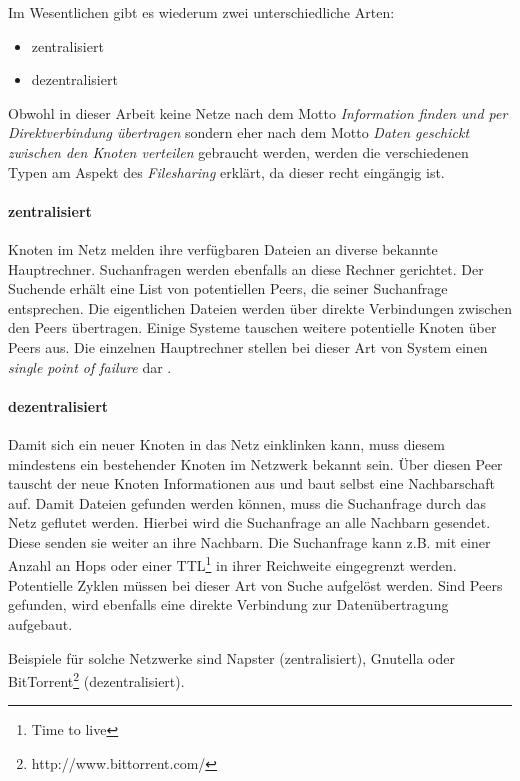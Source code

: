 Im Wesentlichen gibt es wiederum zwei unterschiedliche Arten:
\begin{itemize}
\item zentralisiert
\item dezentralisiert
\end{itemize}

Obwohl in dieser Arbeit keine Netze nach dem Motto \emph{Information finden und per Direktverbindung übertragen} sondern eher nach dem Motto \emph{Daten geschickt zwischen den Knoten verteilen} gebraucht werden, werden die verschiedenen Typen am Aspekt des \emph{Filesharing} erklärt, da dieser recht eingängig ist.\\

\paragraph{zentralisiert} Knoten im Netz melden ihre verfügbaren Dateien an diverse bekannte Hauptrechner. Suchanfragen werden ebenfalls an diese Rechner gerichtet. Der Suchende erhält eine List von potentiellen Peers, die seiner Suchanfrage entsprechen. Die eigentlichen Dateien werden über direkte Verbindungen zwischen den Peers übertragen. Einige Systeme tauschen weitere potentielle Knoten über Peers aus. Die einzelnen Hauptrechner stellen bei dieser Art von System einen \emph{single point of failure} dar \cite{Eberspaecher2005}.

\paragraph{dezentralisiert} Damit sich ein neuer Knoten in das Netz einklinken kann, muss diesem mindestens ein bestehender Knoten im Netzwerk bekannt sein. Über diesen Peer tauscht der neue Knoten Informationen aus und baut selbst eine Nachbarschaft auf. Damit Dateien gefunden werden können, muss die Suchanfrage durch das Netz geflutet werden. Hierbei wird die Suchanfrage an alle Nachbarn gesendet. Diese senden sie weiter an ihre Nachbarn. Die Suchanfrage kann z.B. mit einer Anzahl an Hops oder einer TTL\footnote{Time to live} in ihrer Reichweite eingegrenzt werden. Potentielle Zyklen müssen bei dieser Art von Suche aufgelöst werden. Sind Peers gefunden, wird ebenfalls eine direkte Verbindung zur Datenübertragung aufgebaut.

Beispiele für solche Netzwerke sind Napster (zentralisiert), Gnutella oder BitTorrent\footnote{http://www.bittorrent.com/} (dezentralisiert).

